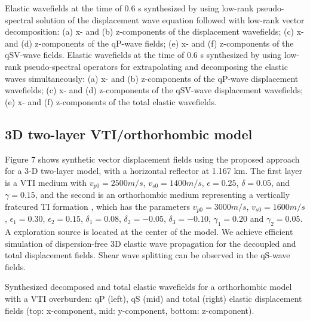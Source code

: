 {
Elastic wavefields at the time of 0.6 s synthesized by using low-rank pseudo-spectral solution of the displacement
wave equation followed with low-rank vector decomposition:
(a) x- and (b) z-components of the displacement wavefields;
(c) x- and (d) z-components of the qP-wave fields;
(e) x- and (f) z-components of the qSV-wave fields.
}
{
Elastic wavefields at the time of 0.6 s synthesized by using low-rank pseudo-spectral operators
for extrapolating and decomposing the elastic waves simultaneously:
(a) x- and (b) z-components of the qP-wave displacement wavefields;
(c) x- and (d) z-components of the qSV-wave displacement wavefields;
(e) x- and (f) z-components of the total elastic wavefields.
}

\subsection{3D two-layer VTI/orthorhombic model}

Figure 7 shows synthetic vector displacement fields using the proposed approach for a 3-D two-layer model, with a horizontal reflector at 1.167 km.
The first layer is a VTI medium with $v_{p0}=2500 m/s$, $v_{s0}=1400 m/s$, $\epsilon=0.25$, $\delta=0.05$, and $\gamma=0.15$,
and the second is an orthorhombic medium representing a vertically fratcured TI formation \cite[]{schoenberg:1997,tsvankin:2001}, which has
the parameters 
$v_{p0}=3000 m/s$, $v_{s0}=1600 m/s$, $\epsilon_1=0.30$, $\epsilon_2=0.15$, $\delta_1=0.08$, $\delta_2=-0.05$, $\delta_3=-0.10$, $\gamma_1=0.20$ and $\gamma_2=0.05$.
A exploration source is located at the center of the model.
We achieve efficient simulation of dispersion-free 3D elastic wave propagation for the decoupled and total displacement fields.
Shear wave splitting can be observed in the qS-wave fields.

{
Synthesized decomposed and total elastic wavefields for a orthorhombic model with a VTI overburden:
qP (left), qS (mid) and total (right) elastic displacement fields (top: x-component, mid: y-component, bottom: z-component).
}

